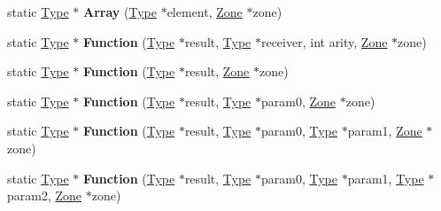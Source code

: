 \begin{DoxyCompactItemize}
\item 
static \hyperlink{classv8_1_1internal_1_1_type}{Type} $\ast$ {\bfseries Array} (\hyperlink{classv8_1_1internal_1_1_type}{Type} $\ast$element, \hyperlink{classv8_1_1internal_1_1_zone}{Zone} $\ast$zone)\hypertarget{classv8_1_1internal_1_1_type_a7e28bbdd003f784f3a41be2c4c8ec0a0}{}\label{classv8_1_1internal_1_1_type_a7e28bbdd003f784f3a41be2c4c8ec0a0}

\item 
static \hyperlink{classv8_1_1internal_1_1_type}{Type} $\ast$ {\bfseries Function} (\hyperlink{classv8_1_1internal_1_1_type}{Type} $\ast$result, \hyperlink{classv8_1_1internal_1_1_type}{Type} $\ast$receiver, int arity, \hyperlink{classv8_1_1internal_1_1_zone}{Zone} $\ast$zone)\hypertarget{classv8_1_1internal_1_1_type_a74916dc5b4175f6973bbdf7e21238f9a}{}\label{classv8_1_1internal_1_1_type_a74916dc5b4175f6973bbdf7e21238f9a}

\item 
static \hyperlink{classv8_1_1internal_1_1_type}{Type} $\ast$ {\bfseries Function} (\hyperlink{classv8_1_1internal_1_1_type}{Type} $\ast$result, \hyperlink{classv8_1_1internal_1_1_zone}{Zone} $\ast$zone)\hypertarget{classv8_1_1internal_1_1_type_a96bb92de89ab9e081e0defb4cfcfc340}{}\label{classv8_1_1internal_1_1_type_a96bb92de89ab9e081e0defb4cfcfc340}

\item 
static \hyperlink{classv8_1_1internal_1_1_type}{Type} $\ast$ {\bfseries Function} (\hyperlink{classv8_1_1internal_1_1_type}{Type} $\ast$result, \hyperlink{classv8_1_1internal_1_1_type}{Type} $\ast$param0, \hyperlink{classv8_1_1internal_1_1_zone}{Zone} $\ast$zone)\hypertarget{classv8_1_1internal_1_1_type_aef4f57be2aaedbad0c51a5e795242f69}{}\label{classv8_1_1internal_1_1_type_aef4f57be2aaedbad0c51a5e795242f69}

\item 
static \hyperlink{classv8_1_1internal_1_1_type}{Type} $\ast$ {\bfseries Function} (\hyperlink{classv8_1_1internal_1_1_type}{Type} $\ast$result, \hyperlink{classv8_1_1internal_1_1_type}{Type} $\ast$param0, \hyperlink{classv8_1_1internal_1_1_type}{Type} $\ast$param1, \hyperlink{classv8_1_1internal_1_1_zone}{Zone} $\ast$zone)\hypertarget{classv8_1_1internal_1_1_type_ace53794ae44c7bd9e3461c14e323beb6}{}\label{classv8_1_1internal_1_1_type_ace53794ae44c7bd9e3461c14e323beb6}

\item 
static \hyperlink{classv8_1_1internal_1_1_type}{Type} $\ast$ {\bfseries Function} (\hyperlink{classv8_1_1internal_1_1_type}{Type} $\ast$result, \hyperlink{classv8_1_1internal_1_1_type}{Type} $\ast$param0, \hyperlink{classv8_1_1internal_1_1_type}{Type} $\ast$param1, \hyperlink{classv8_1_1internal_1_1_type}{Type} $\ast$param2, \hyperlink{classv8_1_1internal_1_1_zone}{Zone} $\ast$zone)\hypertarget{classv8_1_1internal_1_1_type_a6cb3d249e95d454ae47d060c8e1b36b4}{}\label{classv8_1_1internal_1_1_type_a6cb3d249e95d454ae47d060c8e1b36b4}


\end{DoxyCompactItemize}
